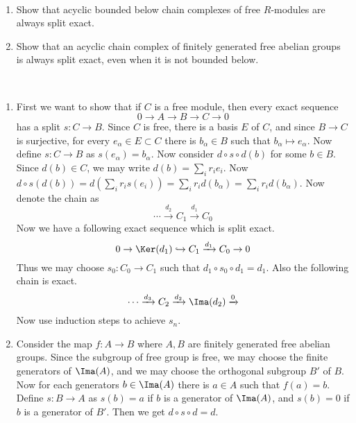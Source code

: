 \begin{exer}
~\begin{enumerate}
\item Show that acyclic bounded below chain complexes of free $R$-modules are always split exact.
\item Show that an acyclic chain complex of finitely generated free abelian groups is always split exact, even when it is not bounded below. 
\end{enumerate}
\end{exer}
\begin{solution}
~\begin{enumerate}
\item First we want to show that if $C$ is a free module, then every exact sequence
\begin{equation}
0\rightarrow A\rightarrow B\rightarrow C\rightarrow 0
\end{equation}
has a split $s:C\rightarrow B$. Since $C$ is free, there is a basis $E$ of $C$, and since $B\rightarrow C$ is surjective, for every $e_\alpha\in E\subset C$ there is $b_\alpha\in B$ such that $b_\alpha\mapsto e_\alpha$. Now define $s:C\rightarrow B$ as $s(e_\alpha)=b_\alpha$. Now consider $d\circ s\circ d(b)$ for some $b\in B$. Since $d(b)\in C$, we may write $d(b)=\sum_i r_i e_i$. Now $d\circ s(d(b))=d(\sum_i r_i s(e_i))=\sum_i r_i d(b_\alpha)=\sum_i r_i d(b_\alpha)$.
Now denote the chain as
\begin{equation}
\cdots\xrightarrow{d_2} C_1\xrightarrow{d_1} C_0
\end{equation}
Now we have a following exact sequence which is split exact.
\begin{equation}
0\rightarrow \Ker(d_1)\hookrightarrow C_1\xrightarrow{d_1}C_0\rightarrow 0
\end{equation}
Thus we may choose $s_0:C_0\rightarrow C_1$ such that $d_1\circ s_0\circ d_1=d_1$. Also the following chain is exact.
\begin{equation}
\cdots \xrightarrow{d_3} C_2\xrightarrow{d_2} \Ima(d_2)\xrightarrow 0
\end{equation}
Now use induction steps to achieve $s_n$.
\item Consider the map $f:A\rightarrow B$ where $A,B$ are finitely generated free abelian groups. Since the subgroup of free group is free, we may choose the finite generators of $\Ima(A)$, and we may choose the orthogonal subgroup $B'$ of $B$. Now for each generators $b\in \Ima(A)$ there is $a\in A$ such that $f(a)=b$. Define $s:B\rightarrow A$ as $s(b)=a$ if $b$ is a generator of $\Ima(A)$, and $s(b)=0$ if $b$ is a generator of $B'$. Then we get $d\circ s\circ d=d$.
\end{enumerate}
\end{solution}

